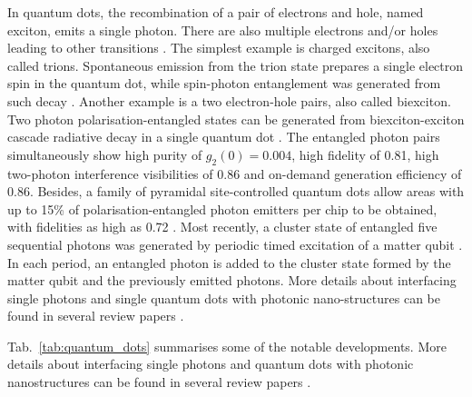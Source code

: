 In quantum dots, the recombination of a pair of electrons and hole, named exciton, emits a single photon. There are also multiple electrons and/or holes leading to other transitions \cite{bib:lodahl2015interfacing}. The simplest example is charged excitons, also called trions. Spontaneous emission from the trion state prepares a single electron spin in the quantum dot, while spin-photon entanglement was generated from such decay \cite{bib:de2012quantum, bib:gao2012observation}. Another example is a two electron-hole pairs, also called biexciton. Two photon polarisation-entangled states can be generated from biexciton-exciton cascade radiative decay in a single quantum dot \cite{bib:muller2014demand}. The entangled photon pairs simultaneously show high purity of \mbox{$g_2(0) = 0.004$}, high fidelity of 0.81, high two-photon interference visibilities of 0.86 and on-demand generation efficiency of 0.86. Besides, a family of pyramidal site-controlled quantum dots allow areas with up to 15\% of polarisation-entangled photon emitters per chip to be obtained, with fidelities as high as 0.72 \cite{bib:juska2013towards, bib:mohan2010polarization}. Most recently, a cluster state of entangled five sequential photons was generated by periodic timed excitation of a matter qubit \cite{bib:schwartz2016deterministic}. In each period, an entangled photon is added to the cluster state formed by the matter qubit and the previously emitted photons. More details about interfacing single photons and single quantum dots with photonic nano-structures can be found in several review papers \cite{bib:de2013ultrafast, bib:urbaszek2013nuclear, bib:lodahl2015interfacing}.

Tab.~\ref{tab:quantum_dots} summarises some of the notable developments. More details about interfacing single photons and quantum dots with photonic nanostructures can be found in several review papers \cite{bib:de2013ultrafast, bib:urbaszek2013nuclear, bib:lodahl2015interfacing}.

